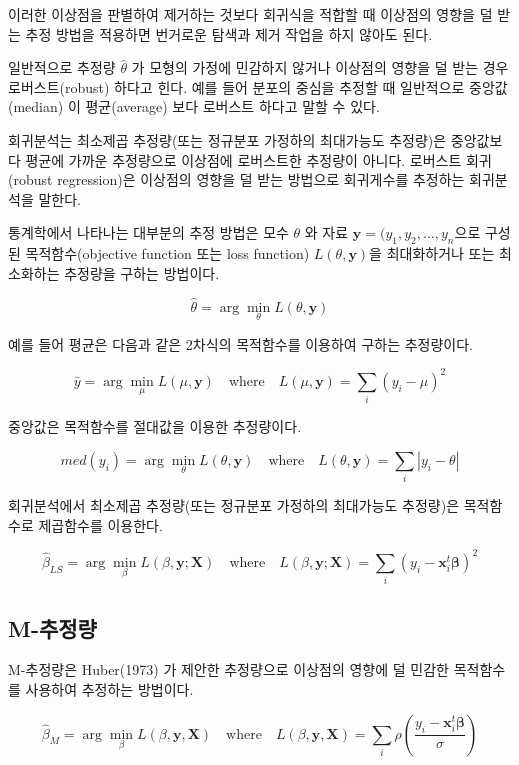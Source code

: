 \documentclass[
  10pt,
]{book}
\theoremstyle{definition}
\theoremstyle{definition}
\theoremstyle{definition}
\theoremstyle{definition}
\theoremstyle{remark}
\begin{document}
이러한 이상점을 판별하여 제거하는 것보다 회귀식을 적합할 때 이상점의 영향을 덜 받는 추정 방법을 적용하면
번거로운 탐색과 제거 작업을 하지 않아도 된다.

일반적으로 추정량 \(\hat \theta\) 가 모형의 가정에 민감하지 않거나 이상점의 영향을 덜 받는 경우 로버스트(robust) 하다고
힌다. 예를 들어 분포의 중심을 추정할 때 일반적으로 중앙값(median) 이 평균(average) 보다 로버스트 하다고 말할 수 있다.

회귀분석는 최소제곱 추정량(또는 정규분포 가정하의 최대가능도 추정량)은 중앙값보다 평균에 가까운 추정량으로
이상점에 로버스트한 추정량이 아니다. 로버스트 회귀(robust regression)은 이상점의 영향을 덜 받는 방법으로 회귀게수를 추정하는 회귀분석을 말한다.

통계학에서 나타나는 대부분의 추정 방법은 모수 \(\theta\) 와 자료 \(\bm y=(y_1,y_2, \dots, y_n\)으로 구성된 목적함수(objective function 또는 loss function) \(L(\theta, \bm y)\)을 최대화하거나 또는 최소화하는 추정량을 구하는 방법이다.

\begin{equation}
\hat \theta = \arg \min_{\theta} L(\theta, \bm y ) 
\label{eq:objective}
\end{equation}

예를 들어 평균은 다음과 같은 2차식의 목적함수를 이용하여 구하는 추정량이다.

\[ \bar y = \arg \min_{\mu} L(\mu, \bm y) \quad \text{where} \quad  L(\mu, \bm y) =\sum_i (y_i - \mu )^2 \]

중앙값은 목적함수를 절대값을 이용한 추정량이다.

\[ med(y_i)= \arg \min_{\theta} L(\theta, \bm y) \quad \text{where} \quad  L(\theta, \bm y) =\sum_i |y_i -\theta|  \]

회귀분석에서 최소제곱 추정량(또는 정규분포 가정하의 최대가능도 추정량)은 목적함수로 제곱함수를 이용한다.

\[ {\hat \beta}_{LS}= \arg \min_{\beta} L(\beta, \bm y; \bm X) \quad \text{where} \quad  L(\beta, \bm y; \bm X)  =\sum_i (y_i - {\bm x}_i^t \bm \beta)^2  \]

\hypertarget{m-uxcd94uxc815uxb7c9}{%
\subsection{M-추정량}\label{m-uxcd94uxc815uxb7c9}}

M-추정량은 Huber(1973) 가 제안한 추정량으로 이상점의 영향에 덜 민감한 목적함수를 사용하여 추정하는 방법이다.

\begin{equation} 
{\hat \beta}_{M}= \arg \min_{\beta} L(\beta, \bm y, \bm X) \quad \text{where} \quad  L(\beta, \bm y, \bm X)  =\sum_i \rho \left ( \frac{ y_i - {\bm x}_i^t \bm \beta}{\sigma } \right )  
\label{eq:m-estimator}
\end{equation}
\end{document}
